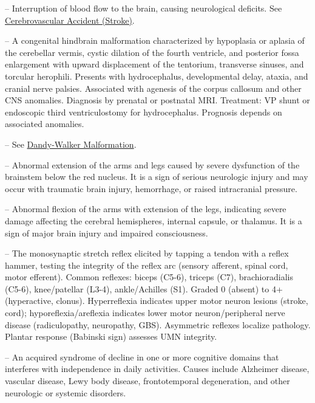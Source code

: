 -- Interruption of blood flow to the brain, causing neurological deficits. See \hyperlink{Cerebrovascular Accident (Stroke)}{Cerebrovascular Accident (Stroke)}.

-- A congenital hindbrain malformation characterized by hypoplasia or aplasia of the cerebellar vermis, cystic dilation of the fourth ventricle, and posterior fossa enlargement with upward displacement of the tentorium, transverse sinuses, and torcular herophili. Presents with hydrocephalus, developmental delay, ataxia, and cranial nerve palsies. Associated with agenesis of the corpus callosum and other CNS anomalies. Diagnosis by prenatal or postnatal MRI. Treatment: VP shunt or endoscopic third ventriculostomy for hydrocephalus. Prognosis depends on associated anomalies.

-- See \hyperlink{Dandy-Walker Malformation}{Dandy-Walker Malformation}.

-- Abnormal extension of the arms and legs caused by severe dysfunction of the brainstem below the red nucleus. It is a sign of serious neurologic injury and may occur with traumatic brain injury, hemorrhage, or raised intracranial pressure.

-- Abnormal flexion of the arms with extension of the legs, indicating severe damage affecting the cerebral hemispheres, internal capsule, or thalamus. It is a sign of major brain injury and impaired consciousness.

-- The monosynaptic stretch reflex elicited by tapping a tendon with a reflex hammer, testing the integrity of the reflex arc (sensory afferent, spinal cord, motor efferent). Common reflexes: biceps (C5-6), triceps (C7), brachioradialis (C5-6), knee/patellar (L3-4), ankle/Achilles (S1). Graded 0 (absent) to 4+ (hyperactive, clonus). Hyperreflexia indicates upper motor neuron lesions (stroke, cord); hyporeflexia/areflexia indicates lower motor neuron/peripheral nerve disease (radiculopathy, neuropathy, GBS). Asymmetric reflexes localize pathology. Plantar response (Babinski sign) assesses UMN integrity.

-- An acquired syndrome of decline in one or more cognitive domains that interferes with independence in daily activities. Causes include Alzheimer disease, vascular disease, Lewy body disease, frontotemporal degeneration, and other neurologic or systemic disorders.

